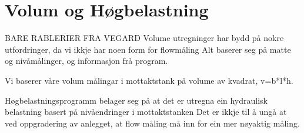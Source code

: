 \section{Volum og Høgbelastning}
\thispagestyle{fancy}
BARE RABLERIER FRA VEGARD
Volume utregninger har bydd på nokre utfordringer, da vi ikkje har noen form for flowmåling
Alt baserer seg på matte og nivåmålinger, og informasjon frå program.

Vi baserer våre volum målingar i mottaktstank på volume av kvadrat, v=b*l*h.

Høgbelastningsprogramm belager seg på at det er utregna ein hydraulisk belastning basert på nivåendringer i mottaktstanken
Det er ikkje til å ungå at ved oppgradering av anlegget, at flow måling må inn for ein mer nøyaktig måling.